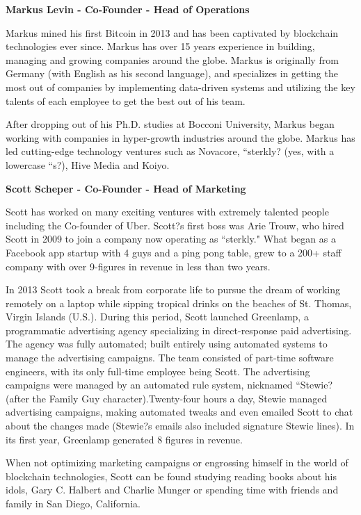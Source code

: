 \documentclass{article}
\begin{document}
\begin {framed}
\begin {center}
\textbf{Markus Levin - Co-Founder - Head of Operations}\par
\end {center}
Markus mined his first Bitcoin in 2013 and has been captivated by blockchain technologies ever since. Markus has over 15 years experience in building, managing and growing companies around the globe. Markus is originally from Germany (with English as his second language), and specializes in getting the most out of companies by implementing data-driven systems and utilizing the key talents of each employee to get the best out of his team.

After dropping out of his Ph.D. studies at Bocconi University, Markus began working with companies in hyper-growth industries around the globe. Markus has led cutting-edge technology ventures such as Novacore, ``sterkly? (yes, with a lowercase ``s?), Hive Media and Koiyo.

\end {framed}

\begin {framed}
\begin {center}
\textbf{Scott Scheper - Co-Founder - Head of Marketing}\par
\end {center}
Scott has worked on many exciting ventures with extremely talented people including the Co-founder of Uber. Scott?s first boss was Arie Trouw, who hired Scott in 2009 to join a company now operating as ``sterkly." What began as a Facebook app startup with 4 guys and a ping pong table, grew to a 200+ staff company with over 9-figures in revenue in less than two years.

In 2013 Scott took a break from corporate life to pursue the dream of working remotely on a laptop while sipping tropical drinks on the beaches of St. Thomas, Virgin Islands (U.S.). During this period, Scott launched Greenlamp, a programmatic advertising agency specializing in direct-response paid advertising. The agency was fully automated; built entirely using automated systems to manage the advertising campaigns. The team consisted of part-time software engineers, with its only full-time employee being Scott. The advertising campaigns were managed by an automated rule system, nicknamed ``Stewie? (after the Family Guy character).Twenty-four hours a day, Stewie managed advertising campaigns, making automated tweaks and even emailed Scott to chat about the changes made (Stewie?s emails also included signature Stewie lines). In its first year, Greenlamp generated 8 figures in revenue.

When not optimizing marketing campaigns or engrossing himself in the world of blockchain technologies, Scott can be found studying reading books about his idols, Gary C. Halbert and Charlie Munger or spending time with friends and family in San Diego, California.

\end {framed}
\end{document}
